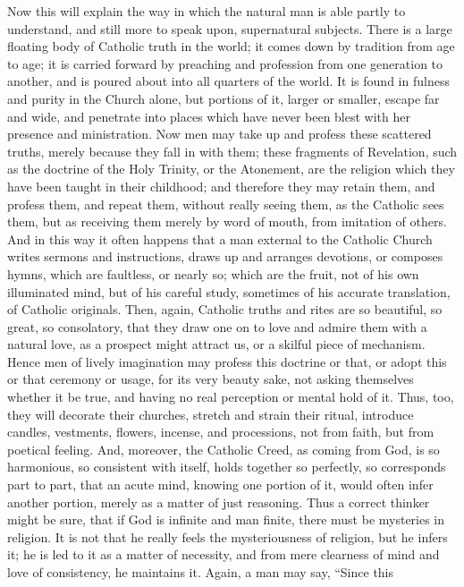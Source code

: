Now this will explain the way in which the natural man is able
partly to understand, and still more to speak upon, supernatural
subjects. There is a large floating body of Catholic truth in the
world; it comes down by tradition from age to age; it is carried
forward by preaching and profession from one generation to another,
and is poured about into all quarters of the world. It is found in
fulness and purity in the Church alone, but portions of it, larger or
smaller, escape far and wide, and penetrate into places which have
never been blest with her presence and ministration. Now men may take
up and profess these scattered truths, merely because they fall in
with them; these fragments of Revelation, such as the doctrine of the
Holy Trinity, or the Atonement, are the religion which they have been
taught in their childhood; and therefore they may retain them, and
profess them, and repeat them, without really seeing them, as the
Catholic sees them, but as receiving them merely by word of mouth,
from imitation of others. And in this way it often happens that a man
external to the Catholic Church writes sermons and instructions, draws
up and arranges devotions, or composes hymns, which are faultless, or
nearly so; which are the fruit, not of his own illuminated mind, but
of his careful study, sometimes of his accurate translation, of
Catholic originals. Then, again, Catholic truths and rites are so
beautiful, so great, so consolatory, that they draw one on to love and
admire them with a natural love, as a prospect might attract us, or a
skilful piece of mechanism. Hence men of lively imagination may
profess this doctrine or that, or adopt this or that ceremony or
usage, for its very beauty sake, not asking themselves whether it be
true, and having no real perception or mental hold of it. Thus, too,
they will decorate their churches, stretch and strain their ritual,
introduce candles, vestments, flowers, incense, and processions, not
from faith, but from poetical feeling. And, moreover, the Catholic
Creed, as coming from God, is so harmonious, so consistent with
itself, holds together so perfectly, so corresponds part to part, that
an acute mind, knowing one portion of it, would often infer another
portion, merely as a matter of just reasoning. Thus a correct thinker
might be sure, that if God is infinite and man finite, there must be
mysteries in religion. It is not that he really feels the
mysteriousness of religion, but he infers it; he is led to it as a
matter of necessity, and from mere clearness of mind and love of
consistency, he maintains it. Again, a man may say, ``Since this
